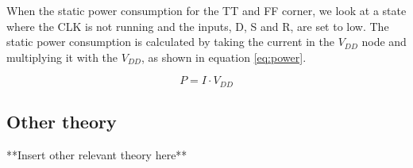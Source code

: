 When  the static power consumption for the TT and FF corner, we look at a state where the CLK is not running and the inputs, D, S and R, are set to low. The static power consumption is calculated by taking the current in the $V_{DD}$ node and multiplying it with the $V_{DD}$, as shown in equation \ref{eq:power}.

\begin{equation}
    \label{eq:power}
    P = I \cdot V_{DD}
\end{equation}

\subsection{Other theory}\label{subsec:theory_aSubsection}

**Insert other relevant theory here**



